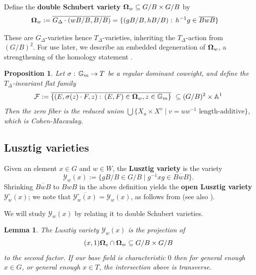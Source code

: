 \documentclass[11pt]{amsart}
\newtheorem{lemma}[Thm]{Lemma}
\newtheorem{proposition}[Thm]{Proposition}
\theoremstyle{definition}
\newcommand{\MSB}[1]{\textcolor{violet}{[MSB: #1]}}
\newcommand{\AK}[1]{\textcolor{darkgreen}{[AK: #1]}}
\newcommand\bOm{{\bf \Omega}}
\def\AA{{\mathbb A }}
\newcommand\calY{{\mathcal Y}}
\newcommand\calF{{\mathcal F}}
\newcommand\Gm{{\mathbb G}_m}
\renewcommand\AA{{\mathbb A}}
\newcommand\junk[1]{}
\renewcommand{\colon}{\mathrel{:}}
\renewcommand{\colon}{:\mkern\thinmuskip}
\begin{document}
Define the \textbf{double Schubert variety} $\bOm_w \subseteq G/B \times G/B$ by
\begin{align*}
    \bOm_w &:= \overline{G_\Delta \cdot (wB/B,B/B)} 
    = \{(gB/B,hB/B)\colon h^{-1}g \in \overline{BwB} \}
\end{align*}


These are $G_{\Delta}$-varieties hence $T_{\Delta}$-varieties, inheriting the
$T_{\Delta}$-action from $(G/B)^2$. For use later, we describe an
embedded degeneration of $\bOm_w$, a strengthening of
the homology statement \cite[Proposition 3.8]{K20-deligne-lusztig}.

\begin{proposition}\label{prop: degeneration of double Schubert}
  \cite[Theorem 5.7, Lemma 5.10]{GabeRaj}
  Let $\sigma\colon \Gm \to T$ be a regular dominant coweight,
  and define the $T_\Delta$-invariant flat family
  \[ \calF := \overline{ \{(E,\sigma(z)\cdot F,z)\colon (E,F)\in \bOm_w,
    z \in \Gm\}} \ \subseteq (G/B)^2 \times \AA^1 \]
  Then the zero fiber is the reduced union
  $\bigcup \{X_u \times X^v \; \lvert \; v = uw^{-1} \text{ length-additive}\}$,
  which is Cohen-Macaulay.
\end{proposition}

\subsection{Lusztig varieties}

Given an element $x \in G$ and $w \in W$, the \textbf{Lusztig variety}
\cite{K20-deligne-lusztig} is the variety
 \[\calY_w(x) := \{gB/B \in G/B \; \lvert \; g^{-1} x g \in \overline{BwB}\}.\]
 Shrinking $\overline{BwB}$ to $BwB$ in the above definition yields the
 \textbf{open Lusztig variety} $\calY_w^\circ(x)$; we note that $\overline{\calY_w^\circ(x)}= \calY_w(x)$, as follows from \cite[Lemma 1.1]{Lus79} (see also \cite[Proposition 2.10]{BHL25-geomLusztig}).
 \junk{\AK{It is in no way a cell. Also, do we use it for anything?} 
 	\MSB{I was borrowing the terminology from \cite{BHL25-geomLusztig}, happy with your version instead. We only need it because Kim works with it and its closure instead of Lusztig varieties as we've defined them, so I wanted to justify that his results apply to us. I've streamlined.}}

 We will study $\calY_w(x)$ by relating it to double Schubert varieties. 

\begin{lemma}\label{prop:transverse-intersections-of-double-Schuberts}
The Lusztig variety $\calY_w(x)$ is the projection of 
\[(x, 1)\bOm_{e} \cap \bOm_w \subseteq G/B \times G/B\] to the second
factor. If our base field is characteristic $0$ then
for general enough $x\in G$, or general enough $x\in T$, the
intersection above is transverse.  \junk{Allen, should ``generic" be
  something else here?  Also it would be a lot nicer to say
  ``including for all regular semisimple $x$" but I do not know how to
  get this from Kleiman transversality directly.}
\end{lemma}
\end{document}
